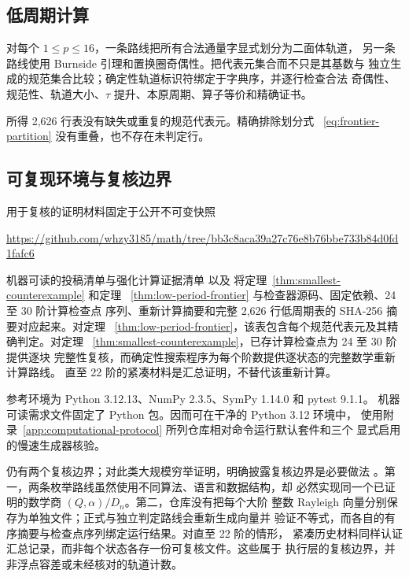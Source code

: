 \subsection{低周期计算}

对每个 \(1\leq p\leq16\)，一条路线把所有合法通量字显式划分为二面体轨道，
另一条路线使用 Burnside 引理和置换圈奇偶性。把代表元集合而不只是其基数与
独立生成的规范集合比较；确定性轨道标识符绑定于字典序，并逐行检查合法
奇偶性、规范性、轨道大小、\(\tau\) 提升、本原周期、算子等价和精确证书。

所得 2,626 行表没有缺失或重复的规范代表元。精确排除划分式~
\eqref{eq:frontier-partition} 没有重叠，也不存在未判定行。

\subsection{可复现环境与复核边界}

用于复核的证明材料固定于公开不可变快照

\begin{center}
\url{https://github.com/whzy3185/math/tree/bb3c8aca39a27c76e8b76bbe733b84d0fd1fafc6}
\end{center}

机器可读的投稿清单与强化计算证据清单
\allowbreak{}\allowbreak{}
以及
\allowbreak{}\allowbreak{}
将定理~\ref{thm:smallest-counterexample} 和定理~
\ref{thm:low-period-frontier} 与检查器源码、固定依赖、24 至 30 阶计算检查点
序列、重新计算摘要和完整 2,626 行低周期表的 SHA-256 摘要对应起来。对定理~
\ref{thm:low-period-frontier}，该表包含每个规范代表元及其精确判定。对定理~
\ref{thm:smallest-counterexample}，已存计算检查点为 24 至 30 阶提供逐块
完整性复核，而确定性搜索程序为每个阶数提供逐状态的完整数学重新计算路线。
直至 22 阶的紧凑材料是汇总证明，不替代该重新计算。

参考环境为 Python 3.12.13、NumPy 2.3.5、SymPy 1.14.0 和 pytest 9.1.1。
机器可读需求文件固定了 Python 包。因而可在干净的 Python 3.12 环境中，
使用附录~\ref{app:computational-protocol} 所列仓库相对命令运行默认套件和三个
显式启用的慢速生成器核验。

仍有两个复核边界；对此类大规模穷举证明，明确披露复核边界是必要做法
\cite{Lam1991}。第一，两条枚举路线虽然使用不同算法、语言和数据结构，却
必然实现同一个已证明的数学商 \((Q,\alpha)/D_n\)。第二，仓库没有把每个大阶
整数 Rayleigh 向量分别保存为单独文件；正式与独立判定路线会重新生成向量并
验证不等式，而各自的有序摘要与检查点序列绑定运行结果。对直至 22 阶的情形，
紧凑历史材料同样认证汇总记录，而非每个状态各存一份可复核文件。这些属于
执行层的复核边界，并非浮点容差或未经核对的轨道计数。
